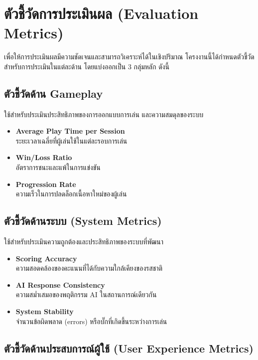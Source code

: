 \section{ตัวชี้วัดการประเมินผล (Evaluation Metrics)}

เพื่อให้การประเมินผลมีความชัดเจนและสามารถวิเคราะห์ได้ในเชิงปริมาณ โครงงานนี้ได้กำหนดตัวชี้วัด สำหรับการประเมินในแต่ละด้าน โดยแบ่งออกเป็น 3 กลุ่มหลัก ดังนี้

\subsection{ตัวชี้วัดด้าน Gameplay}

ใช้สำหรับประเมินประสิทธิภาพของการออกแบบการเล่น และความสมดุลของระบบ

\begin{itemize}
\item \textbf{Average Play Time per Session} \\
ระยะเวลาเฉลี่ยที่ผู้เล่นใช้ในแต่ละรอบการเล่น

\item \textbf{Win/Loss Ratio} \\
อัตราการชนะและแพ้ในการแข่งขัน

\item \textbf{Progression Rate} \\
ความเร็วในการปลดล็อกเนื้อหาใหม่ของผู้เล่น
\end{itemize}

\subsection{ตัวชี้วัดด้านระบบ (System Metrics)}

ใช้สำหรับประเมินความถูกต้องและประสิทธิภาพของระบบที่พัฒนา

\begin{itemize}
\item \textbf{Scoring Accuracy} \\
ความสอดคล้องของคะแนนที่ได้กับความใกล้เคียงของรสชาติ

\item \textbf{AI Response Consistency} \\
ความสม่ำเสมอของพฤติกรรม AI ในสถานการณ์เดียวกัน

\item \textbf{System Stability} \\
จำนวนข้อผิดพลาด (errors) หรือบั๊กที่เกิดขึ้นระหว่างการเล่น
\end{itemize}

\subsection{ตัวชี้วัดด้านประสบการณ์ผู้ใช้ (User Experience Metrics)}

